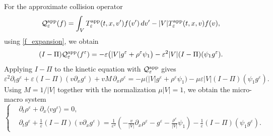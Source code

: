 \documentclass[11pt,twoside]{article}
\numberwithin{equation}{section}
\theoremstyle{plain}
\theoremstyle{nonumberplain}
\begin{document}
{For the approximate collision operator
\[
\mathcal{Q}_\varepsilon^{\rm app}(f)
=
\int_V T_\varepsilon^{\rm app}(t,x,v')f(v')\,dv'
-
|V|T_\varepsilon^{\rm app}(t,x,v)f(v),
\]
using \eqref{f_expansion}, we obtain
\[
(I-\Pi)\mathcal Q_\varepsilon^{\rm app}(f^\varepsilon)
=
-\varepsilon\bigl(|V|g^\varepsilon+\rho^\varepsilon\psi_1\bigr)
-\varepsilon^2|V|(I-\Pi)(\psi_1g^\varepsilon).
\]
Applying \(I-\Pi\) to the kinetic equation with
\(\mathcal Q_\varepsilon^{\rm app}\) gives
\[
\varepsilon^2 \partial_t g^\varepsilon
+
\varepsilon (I-\Pi)(v\partial_x g^\varepsilon)
+
vM\,\partial_x \rho^\varepsilon
=
-\mu\bigl(|V|g^\varepsilon+\rho^\varepsilon\psi_1\bigr)
-\mu\varepsilon |V|(I-\Pi)(\psi_1g^\varepsilon).
\]
Using \(M=1/|V|\) together with the normalization \(\mu |V|=1\), we obtain
the micro-macro system
\begin{equation}\label{eq:micro-macro-normalized}
\left\{
\begin{aligned}
&\partial_t \rho^\varepsilon
+\partial_x \langle v g^\varepsilon\rangle = 0,\\
&\partial_t g^\varepsilon
+\frac1\varepsilon (I-\Pi)(v\partial_x g^\varepsilon)
=
\frac1{\varepsilon^2}
\left(
-\frac{v}{|V|}\partial_x \rho^\varepsilon
-g^\varepsilon
-\frac{\rho^\varepsilon}{|V|}\psi_1
\right)
-\frac1\varepsilon (I-\Pi)(\psi_1g^\varepsilon).
\end{aligned}
\right.
\end{equation}

}
\end{document}
